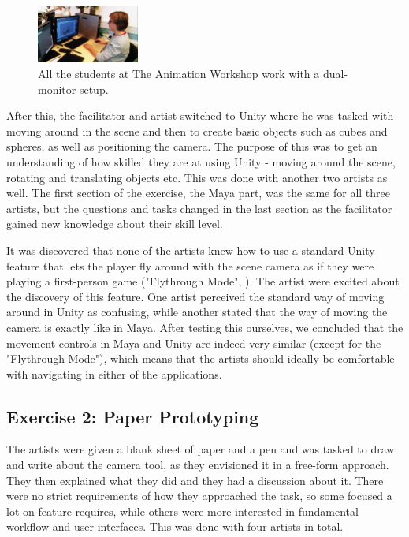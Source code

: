 \begin{figure}[htbp]
\centering
\includegraphics[width=0.3\textwidth]{Pics/Mads_dual}
\caption{All the students at The Animation Workshop work with a dual-monitor setup.}
\label{fig:mads_dual}
\end{figure}

After this, the facilitator and artist switched to Unity where he was tasked with moving around in the scene and then to create basic objects such as cubes and spheres, as well as positioning the camera. The purpose of this was to get an understanding of how skilled they are at using Unity - moving around the scene, rotating and translating objects etc. This was done with another two artists as well. The first section of the exercise, the Maya part, was the same for all three artists, but the questions and tasks changed in the last section as the facilitator gained new knowledge about their skill level.

It was discovered that none of the artists knew how to use a standard Unity feature that lets the player fly around with the scene camera as if they were playing a first-person game ("Flythrough Mode", \cite{unity_flyMode}). The artist were excited about the discovery of this feature. One artist perceived the standard way of moving around in Unity as confusing, while another stated that the way of moving the camera is exactly like in Maya. After testing this ourselves, we concluded that the movement controls in Maya and Unity are indeed very similar (except for the "Flythrough Mode"), which means that the artists should ideally be comfortable with navigating in either of the applications.

\subsection{Exercise 2: Paper Prototyping}
The artists were given a blank sheet of paper and a pen and was tasked to draw and write about the camera tool, as they envisioned it in a free-form approach. They then explained what they did and they had a discussion about it. There were no strict requirements of how they approached the task, so some focused a lot on feature requires, while others were more interested in fundamental workflow and user interfaces. This was done with four artists in total.

